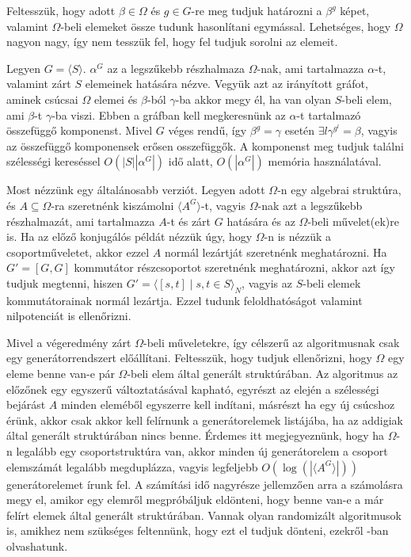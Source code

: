 Feltesszük, hogy adott $\beta\in\Omega$ és $g\in G$-re meg tudjuk határozni a $\beta^g$ képet, valamint $\Omega$-beli
elemeket össze tudunk hasonlítani egymással. Lehetséges, hogy $\Omega$ nagyon nagy, így nem tesszük fel, hogy fel tudjuk sorolni az elemeit.

Legyen $G=\langle S\rangle$. $\alpha^G$ az a legszűkebb részhalmaza $\Omega$-nak, ami tartalmazza $\alpha$-t, valamint zárt $S$ elemeinek hatására nézve.
Vegyük azt az irányított gráfot, aminek csúcsai $\Omega$ elemei és $\beta$-ból $\gamma$-ba akkor megy él, ha van olyan $S$-beli elem, ami $\beta$-t $\gamma$-ba viszi.
Ebben a gráfban kell megkeresnünk az $\alpha$-t tartalmazó összefüggő komponenst.
Mivel $G$ véges rendű, így $\beta^g=\gamma$ esetén $\exists l \gamma^{g^l}=\beta$, vagyis az összefüggő komponensek erősen osszefüggők.
A komponenst meg tudjuk találni szélességi kereséssel $O(|S| |\alpha^G|)$ idő alatt, $O(|\alpha^G|)$ memória használatával.

Most nézzünk egy általánosabb verziót.
Legyen adott $\Omega$-n egy algebrai struktúra, és $A \subseteq \Omega$-ra szeretnénk kiszámolni $\langle A^G \rangle$-t, vagyis
$\Omega$-nak azt a legszűkebb részhalmazát, ami tartalmazza $A$-t és zárt $G$ hatására és az $\Omega$-beli művelet(ek)re is.
Ha az előző konjugálós példát nézzük úgy, hogy $\Omega$-n is nézzük a csoportműveletet, akkor ezzel $A$ normál lezártját szeretnénk meghatározni.
Ha $G'=[G,G]$ kommutátor részcsoportot szeretnénk meghatározni,
akkor azt így tudjuk megtenni, hiszen $G'=\langle[s,t] \mid s,t \in S\rangle_N$, vagyis az $S$-beli elemek kommutátorainak normál lezártja.
Ezzel tudunk feloldhatóságot valamint nilpotenciát is ellenőrizni.

Mivel a végeredmény zárt $\Omega$-beli műveletekre, így célszerű az algoritmusnak csak egy generátorrendszert előállítani.
Feltesszük, hogy tudjuk ellenőrizni, hogy $\Omega$ egy eleme benne van-e pár $\Omega$-beli elem által generált struktúrában.
Az algoritmus az előzőnek egy egyszerű változtatásával kapható, egyrészt az elején a szélességi bejárást $A$ minden eleméből egyszerre kell indítani,
másrészt ha egy új csúcshoz érünk, akkor csak akkor kell felírnunk a generátorelemek listájába, ha az addigiak által generált struktúrában nincs benne.
Érdemes itt megjegyeznünk, hogy ha $\Omega$-n legalább egy csoportstruktúra van, akkor minden új generátorelem a csoport elemszámát legalább megduplázza,
vagyis legfeljebb $O(\log(|\langle A^G\rangle |))$ generátorelemet írunk fel. A számítási idő nagyrésze jellemzően arra a számolásra megy el, amikor egy elemről
megpróbáljuk eldönteni, hogy benne van-e a már felírt elemek által generált struktúrában. Vannak olyan randomizált algoritmusok is, amikhez nem szükséges feltennünk,
hogy ezt el tudjuk dönteni, ezekről \cite{Ser03}-ban olvashatunk.

